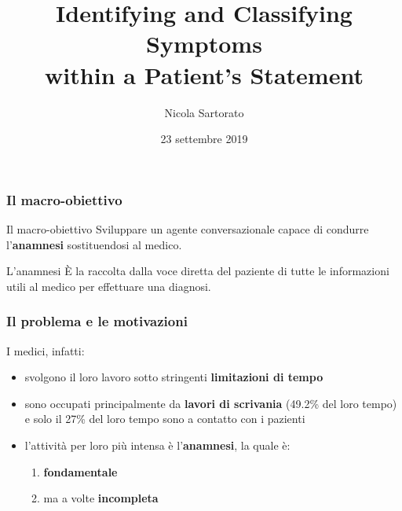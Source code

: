 \documentclass{beamer}
\title[Laurea in Informatica]{Identifying and Classifying Symptoms\\within a Patient's Statement}
\author{Nicola Sartorato}
\institute[UNITN]{Universitá di Trento}
\date{23 settembre 2019}
\begin{document}
\frame{\titlepage}


%
%
 
\begin{frame}
\frametitle{Il macro-obiettivo}

\begin{block}{Il macro-obiettivo}
Sviluppare un agente conversazionale capace di condurre l'\textbf{anamnesi} sostituendosi al medico.
\end{block}

\pause

\begin{alertblock}{L'anamnesi}
È la raccolta dalla voce diretta del paziente di tutte le informazioni utili al medico per effettuare una diagnosi.
\end{alertblock}

\end{frame}

\begin{frame}
\frametitle{Il problema e le motivazioni}
I medici, infatti:

\begin{itemize}
 \item<1-> svolgono il loro lavoro sotto stringenti \textbf{limitazioni di tempo} \pause
 \item<2-> sono occupati principalmente da \textbf{lavori di scrivania }(49.2\% del loro tempo) e solo il 27\% del loro tempo sono a contatto con i pazienti \pause
 \item<3-> l'attività per loro più intensa è l'\textbf{anamnesi}, la quale è:
 \begin{enumerate}

  \item<1-> \textbf{fondamentale}\pause
  \item<2-> ma a volte \textbf{incompleta}
 \end{enumerate}
\end{itemize}

\end{frame}
\end{document}
